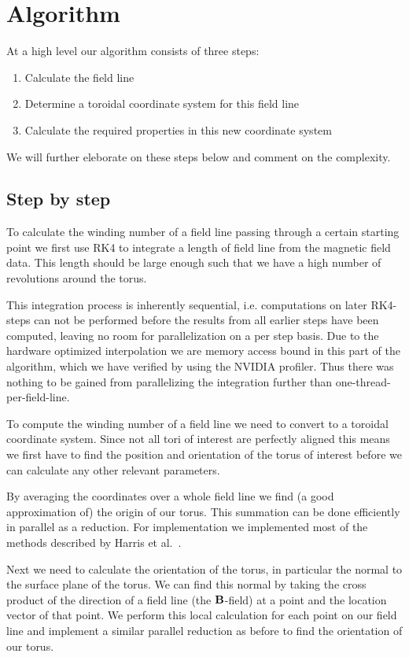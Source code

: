 \documentclass[a4paper]{article}
\renewcommand{\vec}{\bold}
\begin{document}
\section{Algorithm}
At a high level our algorithm consists of three steps: 
\begin{enumerate}
	\item Calculate the field line
	\item Determine a toroidal coordinate system for this field line
	\item Calculate the required properties in this new coordinate system
\end{enumerate}
We will further eleborate on these steps below and comment on the complexity.\\

\subsection{Step by step}

To calculate the winding number of a field line passing through a certain starting point we first use RK4 to integrate a length of field line from the magnetic field data. This length should be large enough such that we have a high number of revolutions around the torus.

This integration process is inherently sequential, i.e. computations on later RK4-steps can not be performed before the results from all earlier steps have been computed, leaving no room for parallelization on a per step basis.
Due to the hardware optimized interpolation we are memory access bound in this part of the algorithm, which we have verified by using the NVIDIA profiler. 
Thus there was nothing to be gained from parallelizing the integration further than one-thread-per-field-line.

To compute the winding number of a field line we need to convert to a toroidal coordinate system. Since not all tori of interest are perfectly aligned this means we first have to find the position and orientation of the torus of interest before we can calculate any other relevant parameters.

By averaging the coordinates over a whole field line we find (a good approximation of) the origin of our torus. This summation can be done efficiently in parallel as a reduction. For implementation we implemented most of the methods described by Harris et al.~\cite{harris2007optimizing}.

Next we need to calculate the orientation of the torus, in particular the normal to the surface plane of the torus. 
We can find this normal by taking the cross product of the direction of a field line (the $\vec{B}$-field) at a point and the location vector of that point. We perform this local calculation for each point on our field line and implement a similar parallel reduction as before to find the orientation of our torus.
\end{document}
